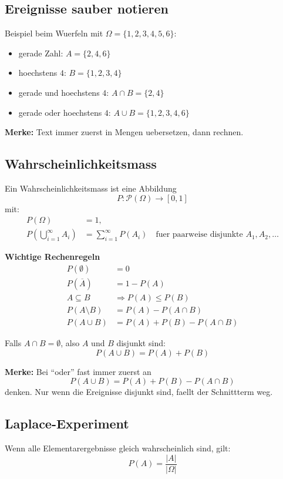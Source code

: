 \documentclass[a4paper,11pt]{article}
\begin{document}
\subsection{Ereignisse sauber notieren}
Beispiel beim Wuerfeln mit $\Omega = \{1,2,3,4,5,6\}$:
\begin{itemize}
  \item gerade Zahl: $A = \{2,4,6\}$
  \item hoechstens $4$: $B = \{1,2,3,4\}$
  \item gerade und hoechstens $4$: $A \cap B = \{2,4\}$
  \item gerade oder hoechstens $4$: $A \cup B = \{1,2,3,4,6\}$
\end{itemize}

\textbf{Merke:}
Text immer zuerst in Mengen uebersetzen, dann rechnen.

\subsection{Wahrscheinlichkeitsmass}
Ein Wahrscheinlichkeitsmass ist eine Abbildung
\[
P : \mathcal{P}(\Omega) \to [0,1]
\]
mit:
\begin{align*}
P(\Omega) &= 1, \\
P\left(\bigcup_{i=1}^{\infty} A_i\right) &= \sum_{i=1}^{\infty} P(A_i)
\quad \text{fuer paarweise disjunkte } A_1, A_2, \dots
\end{align*}

\textbf{Wichtige Rechenregeln}
\begin{align*}
P(\emptyset) &= 0 \\
P(\overline{A}) &= 1 - P(A) \\
A \subseteq B &\Rightarrow P(A) \leq P(B) \\
P(A \setminus B) &= P(A) - P(A \cap B) \\
P(A \cup B) &= P(A) + P(B) - P(A \cap B)
\end{align*}

Falls $A \cap B = \emptyset$, also $A$ und $B$ disjunkt sind:
\[
P(A \cup B) = P(A) + P(B)
\]

\textbf{Merke:}
Bei ``oder'' fast immer zuerst an
\[
P(A \cup B) = P(A) + P(B) - P(A \cap B)
\]
denken. Nur wenn die Ereignisse disjunkt sind, faellt der Schnittterm weg.

\subsection{Laplace-Experiment}
Wenn alle Elementarergebnisse gleich wahrscheinlich sind, gilt:
\[
P(A) = \frac{|A|}{|\Omega|}
\]
\end{document}
